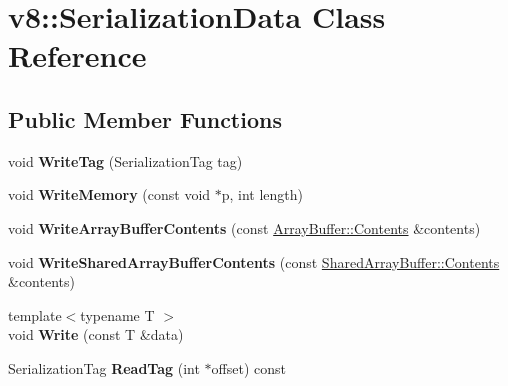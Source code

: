 \hypertarget{classv8_1_1_serialization_data}{}\section{v8\+:\+:Serialization\+Data Class Reference}
\label{classv8_1_1_serialization_data}
\subsection*{Public Member Functions}
\begin{DoxyCompactItemize}
\item 
void {\bfseries Write\+Tag} (Serialization\+Tag tag)\hypertarget{classv8_1_1_serialization_data_aa5e42e8dda2c2d4053e4f7dccd16064f}{}\label{classv8_1_1_serialization_data_aa5e42e8dda2c2d4053e4f7dccd16064f}

\item 
void {\bfseries Write\+Memory} (const void $\ast$p, int length)\hypertarget{classv8_1_1_serialization_data_abf229ca98d0a59e7a7d9dcc223e1d76b}{}\label{classv8_1_1_serialization_data_abf229ca98d0a59e7a7d9dcc223e1d76b}

\item 
void {\bfseries Write\+Array\+Buffer\+Contents} (const \hyperlink{classv8_1_1_array_buffer_1_1_contents}{Array\+Buffer\+::\+Contents} \&contents)\hypertarget{classv8_1_1_serialization_data_a65b23185d2e37a168b2789e4ccb4ca2e}{}\label{classv8_1_1_serialization_data_a65b23185d2e37a168b2789e4ccb4ca2e}

\item 
void {\bfseries Write\+Shared\+Array\+Buffer\+Contents} (const \hyperlink{classv8_1_1_shared_array_buffer_1_1_contents}{Shared\+Array\+Buffer\+::\+Contents} \&contents)\hypertarget{classv8_1_1_serialization_data_afac27d8af100b3149a1041f26e8021c3}{}\label{classv8_1_1_serialization_data_afac27d8af100b3149a1041f26e8021c3}

\item 
{\footnotesize template$<$typename T $>$ }\\void {\bfseries Write} (const T \&data)\hypertarget{classv8_1_1_serialization_data_ae40f52be965c9b16230f7e5e557a4a7f}{}\label{classv8_1_1_serialization_data_ae40f52be965c9b16230f7e5e557a4a7f}

\item 
Serialization\+Tag {\bfseries Read\+Tag} (int $\ast$offset) const \hypertarget{classv8_1_1_serialization_data_ad36c341d38abd9918011182be94a7507}{}\label{classv8_1_1_serialization_data_ad36c341d38abd9918011182be94a7507}


\end{DoxyCompactItemize}
